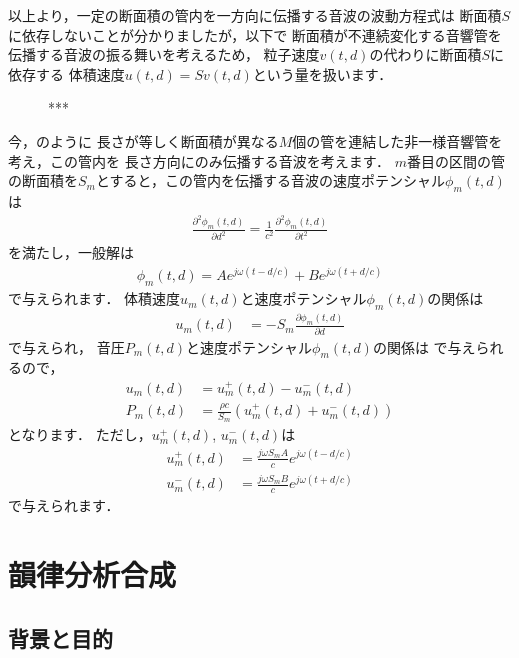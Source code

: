 以上より，一定の断面積の管内を一方向に伝播する音波の波動方程式は
断面積$S$に依存しないことが分かりましたが，以下で
断面積が不連続変化する音響管を伝播する音波の振る舞いを考えるため，
粒子速度$v(t,d)$の代わりに断面積$S$に依存する
体積速度$u(t,d) = S v(t,d)$という量を扱います．

\begin{figure}[t!]
\centering
\vspace{0ex}
 \caption{***}
\label{fig:AcousticTubeModel}
\vspace{0ex}
\end{figure}

今，のように
長さが等しく断面積が異なる$M$個の管を連結した非一様音響管を考え，この管内を
長さ方向にのみ伝播する音波を考えます．
$m$番目の区間の管の断面積を$S_m$とすると，この管内を伝播する音波の速度ポテンシャル$\phi_m(t,d)$は
\begin{align}
\frac{\partial^2 \phi_m(t,d)}{\partial d^2} = 
\frac{1}{c^2}\frac{\partial^2 \phi_m(t,d)}{\partial t^2} 
\label{eq:waveq2}
\end{align}
を満たし，一般解は
\begin{align}
\phi_m(t,d) = A e^{j\omega(t-d/c)} + B e^{j\omega(t+d/c)}
\end{align}
で与えられます．
体積速度$u_m(t,d)$と速度ポテンシャル$\phi_m(t,d)$の関係は
\begin{align}
u_m(t,d) &=
- S_m \frac{\partial \phi_m(t,d)}{\partial d}
\label{eq:def_volvel}
\end{align}
で与えられ，
音圧$P_m(t,d)$と速度ポテンシャル$\phi_m(t,d)$の関係は
で与えられるので，
\begin{align}
u_m(t,d) &= u^+_m(t,d) - u^-_m(t,d)
\\
P_m(t,d)&=\frac{\rho c}{S_m}
(u^+_m(t,d) + u^-_m(t,d))
\end{align}
となります．
ただし，$u^+_m(t,d)$, $u^-_m(t,d)$は
\begin{align}
u^+_m(t,d)&=
\frac{j\omega S_m A}{c}e^{j\omega(t-d/c)}
\\
u^-_m(t,d)&=
\frac{j\omega S_m B}{c}e^{j\omega(t+d/c)}
\end{align}
で与えられます．



\section{韻律分析合成}

\subsection{背景と目的}

